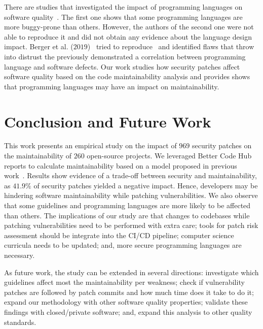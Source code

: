 \documentclass[smallextended]{svjour3}       %
\begin{document}
There are studies that investigated the impact of programming languages on software
quality~\cite{Ray:2014:LSS:2635868.2635922,Ray:2017:LSP:3144574.3126905}. The first
one shows that some programming languages are more buggy-prone than others. However,
the authors of the second one were not able to reproduce it and did not obtain any
evidence about the language design impact. 
Berger et al. ($2019$)~\cite{2019arXiv190110220B} tried to reproduce~\cite{Ray:2014:LSS:2635868.2635922,Ray:2017:LSP:3144574.3126905} 
and identified flaws that throw into distrust the 
previously demonstrated a correlation between programming language and software 
defects. Our work studies how security patches affect software quality based 
on the code maintainability analysis and provides shows that programming languages 
may have an impact on maintainability.

\section{Conclusion and Future Work}\label{sec:conclusions}

This work presents an empirical study on the impact of $969$ security
patches on the maintainability of $260$ open-source projects. We leveraged
Better Code Hub reports to calculate maintainability based on a model proposed in 
previous work~\cite{Olivari:2018,8919169}. Results show evidence of a 
trade-off between security and maintainability, as $41.9\%$ of security patches 
yielded a negative impact. Hence,
developers may be hindering software maintainability while patching 
vulnerabilities. We also observe that some guidelines 
and programming languages are more likely to be affected than others. The implications 
of our study are that changes to codebases while patching 
vulnerabilities need to be performed with extra care; tools
for patch risk assessment should be integrate into the CI/CD pipeline; computer science
curricula needs to be updated; and, more secure programming languages are necessary.

As future work, the study can be extended in several directions: 
investigate which guidelines affect most the maintainability per
weakness; check if vulnerability patches are followed by patch
commits and how much time does it take to do it; 
expand our methodology with other software quality properties; 
validate these findings with closed/private
software; and, expand this analysis to other quality standards.
 

\end{document}
